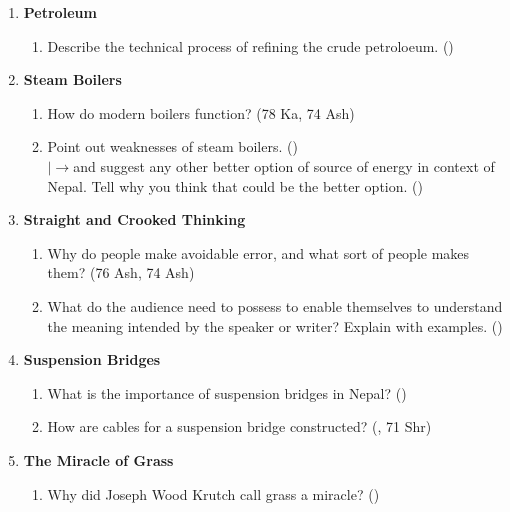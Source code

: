 \documentclass[12pt]{article}
\newcommand{\lb}{\\$\left|\rightarrow\right.$}
\begin{document}
\begin{enumerate}
    \item \textbf{Petroleum}
      \begin{enumerate}[noitemsep, topsep=0pt]
        \item Describe the technical process of refining the crude petroloeum. \hfill ()
      \end{enumerate}

    \item \textbf{Steam Boilers}
      \begin{enumerate}[noitemsep, topsep=0pt]
        \item How do modern boilers function? \hfill (78 Ka, 74 Ash)

        \item Point out weaknesses of steam boilers. \hfill ()
          \lb and suggest any other better option of source of energy in context of Nepal. Tell why you think that could be the better option. \hfill ()
      \end{enumerate}

      \item \textbf{Straight and Crooked Thinking}
      \begin{enumerate}[noitemsep, topsep=0pt]
        \item Why do people make avoidable error, and what sort of people makes them? \hfill (76 Ash, 74 Ash)

        \item What do the audience need to possess to enable themselves to understand the meaning intended by the speaker or writer? Explain with examples. \hfill ()
      \end{enumerate}

      \item \textbf{Suspension Bridges}
      \begin{enumerate}[noitemsep, topsep=0pt]
        \item What is the importance of suspension bridges in Nepal? \hfill ()

        \item How are cables for a suspension bridge constructed? \hfill (, 71 Shr)
      \end{enumerate}

      \item \textbf{The Miracle of Grass}
      \begin{enumerate}[noitemsep, topsep=0pt]
        \item Why did Joseph Wood Krutch call grass a miracle? \hfill ()


\end{enumerate}
\end{enumerate}
\end{document}
